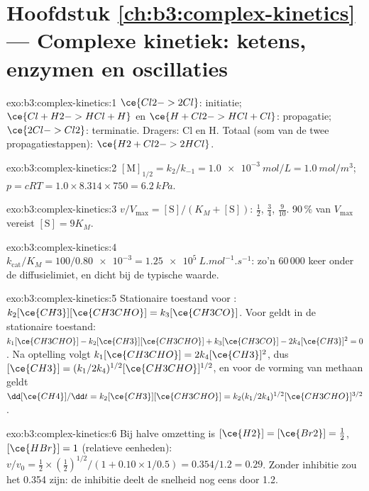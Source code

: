 \section*{Hoofdstuk \ref{ch:b3:complex-kinetics} --- Complexe kinetiek: ketens, enzymen en oscillaties}

\begin{solution}{exo:b3:complex-kinetics:1}
$\ce{Cl2 -> 2 Cl}$: initiatie; $\ce{Cl + H2 -> HCl + H}$ en $\ce{H + Cl2 -> HCl + Cl}$:
propagatie; $\ce{2 Cl -> Cl2}$: terminatie. Dragers: Cl en H. Totaal (som
van de twee propagatiestappen): $\ce{H2 + Cl2 -> 2 HCl}$.
\end{solution}

\begin{solution}{exo:b3:complex-kinetics:2}
$[\mathrm M]_{1/2} = k_2/k_{-1} = \qty{1.0e-3}{mol/L} = \qty{1.0}{mol/m^3}$; $p = cRT = 1.0 \times 8.314 \times 750 =
\qty{6.2}{kPa}$.
\end{solution}

\begin{solution}{exo:b3:complex-kinetics:3}
$v/V_{\max} = [\mathrm S]/(K_M + [\mathrm S])$: $\frac12$, $\frac34$, $\frac{9}{10}$. 90\,\% van $V_{\max}$ vereist $[\mathrm S] = 9K_M$.
\end{solution}

\begin{solution}{exo:b3:complex-kinetics:4}
$k_{\mathrm{cat}}/K_M = 100/\num{0.80e-3} = \qty{1.25e5}{L.mol^{-1}.s^{-1}}$: zo'n 60\,000 keer onder de
diffusielimiet, en dicht bij de typische waarde.
\end{solution}

\begin{solution}{exo:b3:complex-kinetics:5}
Stationaire toestand voor : $k_2[\ce{CH3}][\ce{CH3CHO}] = k_3[\ce{CH3CO}]$. Voor  geldt in de stationaire toestand:
$k_1[\ce{CH3CHO}] - k_2[\ce{CH3}][\ce{CH3CHO}] + k_3[\ce{CH3CO}] - 2k_4[\ce{CH3}]^2 = 0$. Na optelling volgt $k_1[\ce{CH3CHO}] =
2k_4[\ce{CH3}]^2$, dus $[\ce{CH3}] = (k_1/2k_4)^{1/2}[\ce{CH3CHO}]^{1/2}$, en voor de vorming van methaan geldt $\dd[\ce{CH4}]/\dd t = k_2[\ce{CH3}][\ce{CH3CHO}] =
k_2(k_1/2k_4)^{1/2}[\ce{CH3CHO}]^{3/2}$.
\end{solution}

\begin{solution}{exo:b3:complex-kinetics:6}
Bij halve omzetting is $[\ce{H2}] = [\ce{Br2}] = \frac12$, $[\ce{HBr}] = 1$
(relatieve eenheden):
$v/v_0 = \frac12 \times (\frac12)^{1/2}/(1 + 0.10 \times 1/0.5) = 0.354/1.2 = 0.29$. Zonder inhibitie zou
het 0.354 zijn: de inhibitie deelt de snelheid nog eens door 1.2.
\end{solution}

